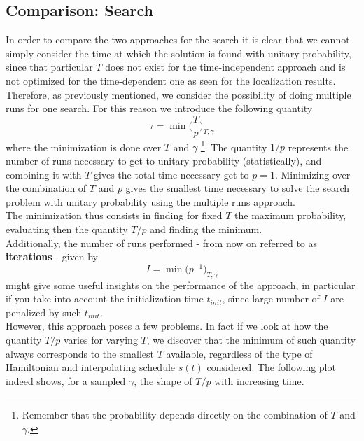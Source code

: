     \subsection{Comparison: Search}
        In order to compare the two approaches for the search it is clear that we cannot simply consider the time at which the solution is found with unitary probability, since that particular $T$ does not exist for the time-independent approach and is not optimized for the time-dependent one as seen for the localization results. Therefore, as previously mentioned, we consider the possibility of doing multiple runs for one search. For this reason we introduce the following quantity
        \begin{equation}
          \tau = \min\bigg(\frac{T}{p}\bigg)_{T, \gamma}
        \end{equation}
        where the minimization is done over $T$ and $\gamma$ \footnote{Remember that the probability depends directly on the combination of $T$ and $\gamma$.}. The quantity $1/p$ represents the number of runs necessary to get to unitary probability (statistically), and combining it with $T$ gives the total time necessary get to $p=1$. Minimizing over the combination of $T$ and $p$ gives the smallest time necessary to solve the search problem with unitary probability using the multiple runs approach.\\ The minimization thus consists in finding for fixed $T$ the maximum probability, evaluating then the quantity $T/p$ and finding the minimum. \\

        \noindent
        Additionally, the number of runs performed - from now on referred to as \textbf{iterations} - given by
        \begin{equation}
          I = \min\big(p^{-1}\big)_{T,\gamma}
        \end{equation}
        might give some useful insights on the performance of the approach, in particular if you take into account the initialization time $t_{init}$, since large number of $I$ are penalized by such $t_{init}$.\\


        \noindent
        However, this approach poses a few problems. In fact if we look at how the quantity $T/p$ varies for varying $T$, we discover that the minimum of such quantity always corresponds to the smallest $T$ available, regardless of the type of Hamiltonian and interpolating schedule $s(t)$ considered. The following plot indeed shows, for a sampled $\gamma$, the shape of $T/p$ with increasing time. \\
        \clearpage
        

